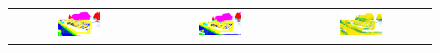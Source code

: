 \begin{figure}[h!]
\begin{tabular}{ccc}
            \includegraphics[width=0.33\textwidth, height=0.18\textheight]{images/seg_output/sem3d_seg_output/2_GT.pdf} &
            \includegraphics[width=0.33\textwidth, height=0.18\textheight]{images/seg_output/sem3d_seg_output/2_Pred.pdf}& 
            \includegraphics[width=0.33\textwidth, height=0.18\textheight]{images/seg_output/sem3d_seg_output/2_max_prob.pdf}\\


\end{tabular}
\end{figure}
